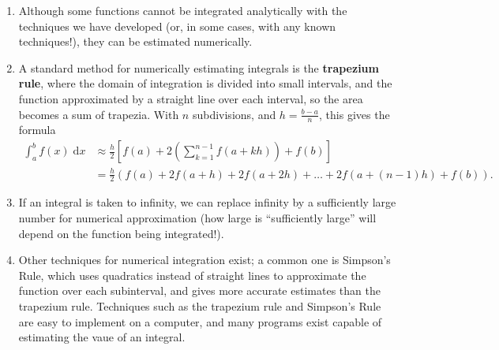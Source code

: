 \documentclass{article}
\newcommand{\diff}{\;\mathrm{d}}
\begin{document}
\vspace{5mm}

\begin{enumerate}
	\item Although some functions cannot be integrated analytically with the techniques we have developed (or, in some cases, with any known techniques!), they can be estimated numerically.
	\item A standard method for numerically estimating integrals is the \textbf{trapezium rule}, where the domain of integration is divided into small intervals, and the function approximated by a straight line over each interval, so the area becomes a sum of trapezia. With $n$ subdivisions, and $h=\frac{b-a}{n}$, this gives the formula
		\begin{align*}
			\int_a^b f(x)\diff x &\approx \frac{h}{2}\left[f(a)+2\left(\sum_{k=1}^{n-1}f(a+kh)\right)+f(b)\right]\\
			&=\frac{h}{2}\left(f(a)+2f(a+h) + 2f(a+2h) + \hdots + 2f(a+(n-1)h) + f(b)\right).
		\end{align*}
	\item If an integral is taken to infinity, we can replace infinity by a sufficiently large number for numerical approximation (how large is ``sufficiently large'' will depend on the function being integrated!).
	\item Other techniques for numerical integration exist; a common one is Simpson's Rule, which uses quadratics instead of straight lines to approximate the function over each subinterval, and gives more accurate estimates than the trapezium rule. Techniques such as the trapezium rule and Simpson's Rule are easy to implement on a computer, and many programs exist capable of estimating the vaue of an integral.
\end{enumerate}
\end{document}
